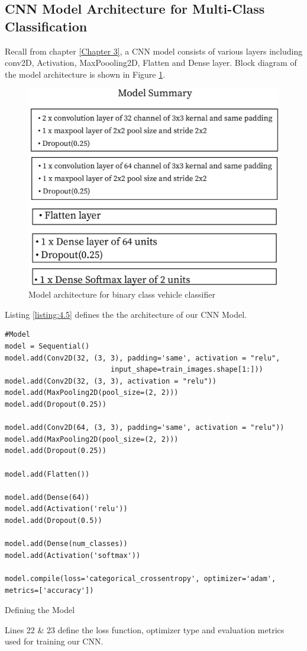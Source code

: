 \subsection{CNN Model Architecture for Multi-Class Classification}
Recall from chapter \ref{Chapter 3}, a CNN model consists of various layers including
conv2D, Activation, MaxPoooling2D, Flatten and Dense layer.
Block diagram of the model architecture is shown in Figure \ref{fig:model_summary_2}. 
\begin{figure}[H]
    \centering
    \captionsetup{justification = centering}
    \includegraphics[scale = 1]{CHAPTERS/Chapter-4/Images/model_summary_2}
    \caption{Model architecture for binary class vehicle classifier} 
    \label{fig:model_summary_2}
\end{figure}
\noindent Listing \ref{listing:4.5}
defines the the architecture of our CNN Model.
\begin{longlisting}
    \begin{verbatim}
#Model
model = Sequential()
model.add(Conv2D(32, (3, 3), padding='same', activation = "relu",
                         input_shape=train_images.shape[1:]))
model.add(Conv2D(32, (3, 3), activation = "relu"))
model.add(MaxPooling2D(pool_size=(2, 2)))
model.add(Dropout(0.25))   

model.add(Conv2D(64, (3, 3), padding='same', activation = "relu"))
model.add(MaxPooling2D(pool_size=(2, 2)))
model.add(Dropout(0.25)) 
     
model.add(Flatten())

model.add(Dense(64))
model.add(Activation('relu'))
model.add(Dropout(0.5)) 

model.add(Dense(num_classes))
model.add(Activation('softmax'))

model.compile(loss='categorical_crossentropy', optimizer='adam',
metrics=['accuracy'])
    \end{verbatim}
    \caption{Defining the Model}
\label{listing:4.5}
\end{longlisting}
\noindent Lines 22 \& 23 define the loss function,
optimizer type and evaluation metrics used for training our CNN.

